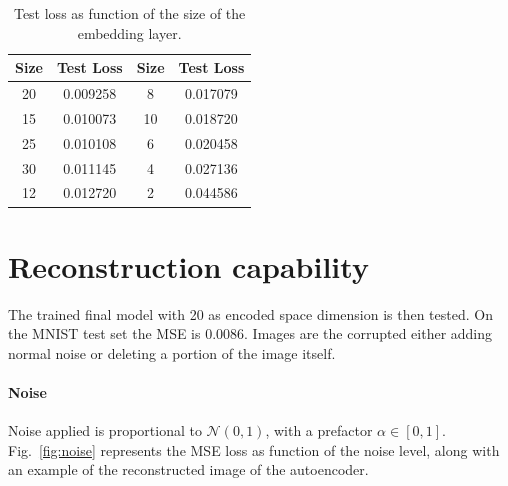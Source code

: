 \documentclass[a4paper,11pt]{article}
\begin{document}
\begin{table}
  \centering
  \caption{Test loss as function of the size of the embedding layer.}
  \label{tab:esd}
  \begin{tabular}{cc|cc}
    \toprule
    Size &  Test Loss & Size &  Test Loss \\
    \midrule
     20 &   0.009258 & 8  &   0.017079\\
     15 &   0.010073 & 10 &   0.018720\\
     25 &   0.010108 & 6  &   0.020458\\
     30 &   0.011145 & 4  &   0.027136\\
     12 &   0.012720 & 2  &   0.044586\\
    \bottomrule
  \end{tabular}
\end{table}

\section{Reconstruction capability}
The trained final model with 20 as encoded space dimension is then tested. On the MNIST test set the MSE is 0.0086. Images are the corrupted either adding normal noise or deleting a portion of the image itself.

\paragraph{Noise} Noise applied is proportional to $\mathcal{N}(0,1)$, with a prefactor $\alpha \in [0,1]$. Fig.~\ref{fig:noise} represents the MSE loss as function of the noise level, along with an example of the reconstructed image of the autoencoder.
\end{document}

